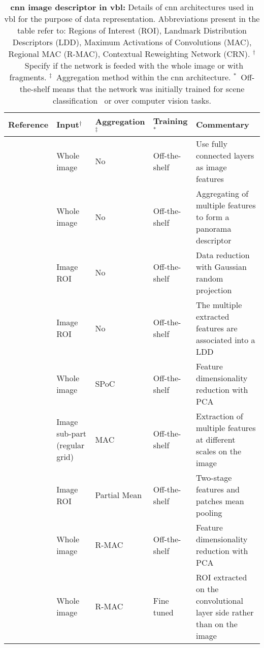 \begin{table}[!ht]
	\centering
	\caption[\Ac{cnn} image descriptor in \ac{vbl}]{\label{tab:cnn_details} \textbf{\ac{cnn} image descriptor in \ac{vbl}:} Details of \ac{cnn} architectures used in \ac{vbl} for the purpose of data representation. Abbreviations present in the table refer to: Regions of Interest (ROI), Landmark Distribution Descriptors (LDD), Maximum Activations of Convolutions (MAC), Regional MAC (R-MAC), Contextual Reweighting Network (CRN). $^\dagger$~Specify if the network is feeded with the whole image or with fragments. $^\ddagger$~Aggregation method within the \ac{cnn} architecture. $^*$~Off-the-shelf means that the network was initially trained for scene classification~\citep{Krizhevsky2012} or over computer vision tasks.}
	\renewcommand{\arraystretch}{1.1}
	\small{
		\begin{tabular}{p{} p{} l l p{}}
			\hline
			\textbf{Reference} 			& \textbf{Input}$^\dagger$ 	& \textbf{Aggregation}$^\ddagger$ 		& \textbf{Training}$^*$ & \textbf{Commentary}\\
			\hline
			\hline
			\citep{Babenko2014,Sunderhauf2015,Yan2016} & Whole image & No & Off-the-shelf & Use fully connected layers as image features\\
			\citep{Kumar2016mastersThesis} & Whole image & No & Off-the-shelf & Aggregating of multiple features to form a panorama descriptor\\
			\hline
			\citep{Sunderhauf2015a,Yan2016} & Image ROI & No & Off-the-shelf & Data reduction with Gaussian random projection \\
			\citep{Panphattarasap2016} & Image ROI & No & Off-the-shelf & The multiple extracted features are associated into a LDD \\			
			\hline
			\citep{Babenko2015} & Whole image & SPoC & Off-the-shelf & Feature dimensionality reduction with PCA \\
			\hline
			\citep{Razavian2014a} & Image sub-part (regular grid) & MAC & Off-the-shelf & Extraction of multiple features at different scales on the image\\
			\hline					
			\citep{Zhi2016} & Image ROI & Partial Mean & Off-the-shelf & Two-stage features and patches mean pooling \\
			\hline
			\citep{Tolias2016} & Whole image & R-MAC & Off-the-shelf & Feature dimensionality reduction with PCA  \\							
			\citep{Gordo2016} & Whole image & R-MAC & Fine tuned & ROI extracted on the convolutional layer side rather than on the image \\

\end{tabular}}
\end{table}
